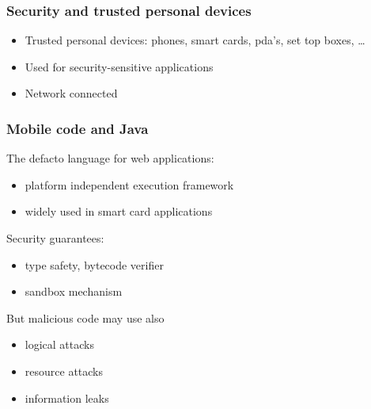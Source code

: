 \documentclass{beamer}
\begin{document}

\begin{frame}\frametitle{Security and trusted personal devices}
\begin{itemize}
\item Trusted personal devices: phones, smart cards, pda's, set
top boxes, \dots
\item Used for security-sensitive applications
\item Network connected
\end{itemize}
\end{frame}


\begin{frame}\frametitle{Mobile code and Java}
The defacto language for web applications:
 \begin{itemize}
  \item platform independent execution framework
  \item widely used in   smart card applications
 \end{itemize}

Security guarantees: 
\begin{itemize}
    \item type safety,  bytecode verifier
     \item sandbox mechanism
\end{itemize}

But malicious code may use also 
\begin{itemize}
     \item logical attacks
     \item resource attacks
       \item information leaks
\end{itemize}
\end{frame}
\end{document}
